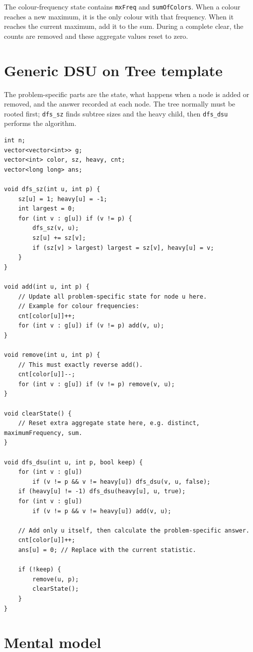 The colour-frequency state contains \texttt{mxFreq} and \texttt{sumOfColors}. When a colour reaches a new maximum, it is the only colour with that frequency. When it reaches the current maximum, add it to the sum. During a complete clear, the counts are removed and these aggregate values reset to zero.

\section{Generic DSU on Tree template}

The problem-specific parts are the state, what happens when a node is added or removed, and the answer recorded at each node. The tree normally must be rooted first; \texttt{dfs\_sz} finds subtree sizes and the heavy child, then \texttt{dfs\_dsu} performs the algorithm.

\begin{lstlisting}
int n;
vector<vector<int>> g;
vector<int> color, sz, heavy, cnt;
vector<long long> ans;

void dfs_sz(int u, int p) {
    sz[u] = 1; heavy[u] = -1;
    int largest = 0;
    for (int v : g[u]) if (v != p) {
        dfs_sz(v, u);
        sz[u] += sz[v];
        if (sz[v] > largest) largest = sz[v], heavy[u] = v;
    }
}

void add(int u, int p) {
    // Update all problem-specific state for node u here.
    // Example for colour frequencies:
    cnt[color[u]]++;
    for (int v : g[u]) if (v != p) add(v, u);
}

void remove(int u, int p) {
    // This must exactly reverse add().
    cnt[color[u]]--;
    for (int v : g[u]) if (v != p) remove(v, u);
}

void clearState() {
    // Reset extra aggregate state here, e.g. distinct, maximumFrequency, sum.
}

void dfs_dsu(int u, int p, bool keep) {
    for (int v : g[u])
        if (v != p && v != heavy[u]) dfs_dsu(v, u, false);
    if (heavy[u] != -1) dfs_dsu(heavy[u], u, true);
    for (int v : g[u])
        if (v != p && v != heavy[u]) add(v, u);

    // Add only u itself, then calculate the problem-specific answer.
    cnt[color[u]]++;
    ans[u] = 0; // Replace with the current statistic.

    if (!keep) {
        remove(u, p);
        clearState();
    }
}
\end{lstlisting}

\section{Mental model}

